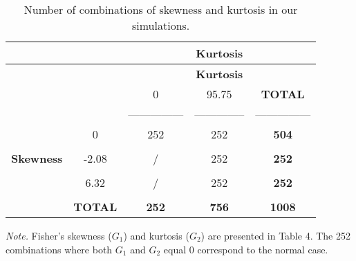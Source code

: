 \documentclass[
  12pt,
  french,
]{article}
\begin{document}
\begin{longtable}[]{@{}ccccc@{}}
\caption{Number of combinations of skewness and kurtosis in our
simulations.}\tabularnewline
\toprule
& & & \textbf{Kurtosis} & \\
\midrule
\endfirsthead
\toprule
& & & \textbf{Kurtosis} & \\
\midrule
\endhead
& & 0 & 95.75 & \textbf{TOTAL} \\
& & --------------- & -------------- & --------------- \\
& 0 & 252 & 252 & \textbf{504} \\
& & & & \\
\textbf{Skewness} & -2.08 & / & 252 & \textbf{252} \\
& & & & \\
& 6.32 & / & 252 & \textbf{252} \\
& & & & \\
& \textbf{TOTAL} & \textbf{252} & \textbf{756} & \textbf{1008} \\
\bottomrule
\end{longtable}

\emph{Note.} Fisher's skewness (\(G_1\)) and kurtosis (\(G_2\)) are
presented in Table 4. The 252 combinations where both \(G_1\) and
\(G_2\) equal 0 correspond to the normal case.
\end{document}
